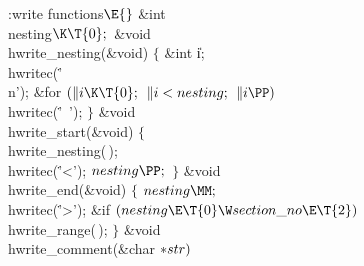\Y\B\4:write functions\X${}\E{}$\6
\&{int} \\{nesting}${}\K\T{0};{}$\7
\&{void} \\{hwrite\_nesting}(\&{void})\1\1\2\2\1\6
\4${}\{{}$\5
\&{int} \|i;\7
\\{hwritec}(\.{'\\n'});\6
\&{for} ${}(\|i\K\T{0};{}$ ${}\|i<\index{nesting+\\{nesting}}\\{nesting};{}$ ${}\|i\PP){}$\1\5
\\{hwritec}(\.{'\ '});\2\6
\4${}\}{}$\2\7
\&{void} \\{hwrite\_start}(\&{void})\1\1\2\2\1\6
\4${}\{{}$\5
\\{hwrite\_nesting}(\,);\5
\\{hwritec}(\.{'<'});\5
${}\index{nesting+\\{nesting}}\\{nesting}\PP;{}$\6
\4${}\}{}$\2\7
\&{void} \\{hwrite\_end}(\&{void})\1\1\2\2\1\6
\4${}\{{}$\5
${}\index{nesting+\\{nesting}}\\{nesting}\MM;{}$\5
\\{hwritec}(\.{'>'});\6
\&{if} ${}(\index{nesting+\\{nesting}}\\{nesting}\E\T{0}\W\index{section no+\\{section\_no}}\\{section\_no}\E\T{2}){}$\1\5
\\{hwrite\_range}(\,);\2\6
\4${}\}{}$\2\7
\&{void} \\{hwrite\_comment}(\&{char} ${}{*}\index{str+\\{str}}\\{str}){}$\1\1\2\2\1\6
